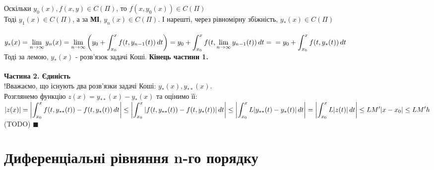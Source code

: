 \documentclass[a4paper, 14pt]{extarticle}
\def\huge{\displaystyle}
\def\bigline{\vspace{5mm}\\}
\def\qed{$\blacksquare$}
\begin{document}
	Оскільки $y_0(x), f(x,y) \in C(\Pi)$, то $f(x,y_0(x)) \in C(\Pi)$\\
	Тоді $y_1(x) \in C(\Pi)$, а за \textbf{МІ}, $y_n(x) \in C(\Pi)$. І нарешті, через рівномірну збіжність, $y_*(x) \in C(\Pi)$\\
	\\
	$\huge y_*(x) = \lim_{n \to \infty} y_n(x) =\lim_{n \to \infty} \left(y_0 + \int_{x_0}^x f(t,y_{n-1}(t))\,dt \right) = y_0 + \int_{x_0}^x f(t, \lim_{n \to \infty} y_{n-1}(t))\,dt = \\ = y_0 + \int_{x_0}^x f(t, y_*(t))\,dt$\\
	Тоді за лемою, $y_*(x)$ - розв'язок задачі Коші. \textbf{Кінець частини 1.}\\
	\bigline
	\textbf{Частина 2. Єдиність}\\
	!Вважаємо, що існують два розв'язки задачі Коші: $y_*(x), y_{**}(x)$.\\
	Розглянемо функцію $z(x) = y_{**}(x) - y_{*}(x)$ та оцінимо її:\\
	$\huge |z(x)| = \abs{\int_{x_0}^x f(t,y_{**}(t))-f(t,y_{*}(t))\,dt} \leq \abs{\int_{x_0}^x \abs{f(t,y_{**}(t))-f(t,y_{*}(t))} \,dt} \leq \abs{\int_{x_0}^x L\abs{y_{**}(t) - y_{*}(t)} \,dt} = \abs{\int_{x_0}^x L\abs{z(t)} \,dt} \leq LM'|x-x_0| \leq LM'h$
	(TODO) \qed
	\newpage
	
	
	\section{Диференціальні рівняння n-го порядку}
\end{document}
